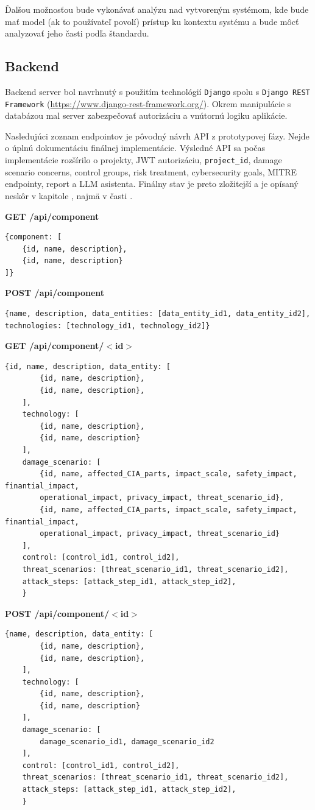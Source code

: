 \documentclass[11pt]{article}
\begin{document}
Ďalšou možnosťou bude vykonávať analýzu nad vytvoreným systémom, kde bude mať model (ak to používateľ povolí) prístup ku kontextu systému a bude môcť analyzovať jeho časti podľa štandardu.

\subsection{Backend}
Backend server bol navrhnutý s použitím technológií \texttt{Django} spolu s \texttt{Django REST Framework} (\url{https://www.django-rest-framework.org/}). Okrem manipulácie s databázou mal server zabezpečovať autorizáciu a vnútornú logiku aplikácie.

Nasledujúci zoznam endpointov je pôvodný návrh API z prototypovej fázy. Nejde o úplnú dokumentáciu finálnej implementácie. Výsledné API sa počas implementácie rozšírilo o projekty, JWT autorizáciu, \texttt{project\_id}, damage scenario concerns, control groups, risk treatment, cybersecurity goals, MITRE endpointy, report a LLM asistenta. Finálny stav je preto zložitejší a je opísaný neskôr v kapitole , najmä v časti .

\textbf{GET /api/component}
\begin{verbatim}
{component: [
    {id, name, description},
    {id, name, description}
]}
\end{verbatim}

\vspace{1cm}
\textbf{POST /api/component}
\begin{verbatim}
{name, description, data_entities: [data_entity_id1, data_entity_id2], 
technologies: [technology_id1, technology_id2]}
\end{verbatim}

\vspace{1cm}
\textbf{GET /api/component/$<$id$>$}
\begin{verbatim}
{id, name, description, data_entity: [
        {id, name, description},
        {id, name, description},
    ], 
	technology: [
		{id, name, description},
		{id, name, description}
	],
	damage_scenario: [
		{id, name, affected_CIA_parts, impact_scale, safety_impact, finantial_impact, 
        operational_impact, privacy_impact, threat_scenario_id},
		{id, name, affected_CIA_parts, impact_scale, safety_impact, finantial_impact, 
        operational_impact, privacy_impact, threat_scenario_id}
	],
	control: [control_id1, control_id2],
	threat_scenarios: [threat_scenario_id1, threat_scenario_id2],
	attack_steps: [attack_step_id1, attack_step_id2],
	}
\end{verbatim}
\vspace{1cm}
\textbf{POST /api/component/$<$id$>$} 
\begin{verbatim}
{name, description, data_entity: [
        {id, name, description},
        {id, name, description},
    ], 
	technology: [
		{id, name, description},
		{id, name, description}
	],
	damage_scenario: [
		damage_scenario_id1, damage_scenario_id2
	],
	control: [control_id1, control_id2],
	threat_scenarios: [threat_scenario_id1, threat_scenario_id2],
	attack_steps: [attack_step_id1, attack_step_id2],
	}
\end{verbatim}
\end{document}
